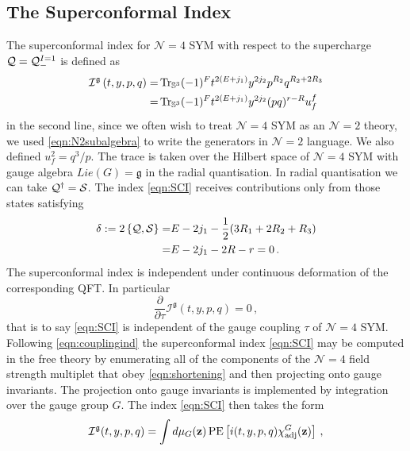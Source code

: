 \documentclass[main.tex]{subfiles}
\begin{document}
\subsection{The Superconformal Index}
The superconformal index for $\mathcal{N}=4$ SYM with respect to the supercharge $\mathcal{Q}=\mathcal{Q}_{-}^{I=1}$ is defined as \cite{Kinney:2005ej,Romelsberger:2005eg}
\begin{equation}
\begin{aligned}\label{eqn:SCI}
 \mathcal{I}^{\mathfrak{g}}\left(t,y,p,q\right)=&\operatorname{Tr}_{\mathbb{S}^3}(-1)^Ft^{2(E+j_1)}y^{2j_2}p^{R_2}q^{R_2+2R_3}\\
 =&\operatorname{Tr}_{\mathbb{S}^3}(-1)^Ft^{2(E+j_1)}y^{2j_2}(pq)^{r-R}u_f^f 
\end{aligned}
\end{equation}
in the second line, since we often wish to treat $\mathcal{N}=4$ SYM as an $\mathcal{N}=2$ theory, we used \eqref{eqn:N2subalgebra} to write the generators in $\mathcal{N}=2$ language. We also defined $u_f^2=q^3/p$. The trace is taken over the Hilbert space of $\mathcal{N}=4$ SYM with gauge algebra $Lie(G)=\mathfrak{g}$ in the radial quantisation. In radial quantisation we can take $\mathcal{Q}^{\dagger}=\mathcal{S}$. The index \eqref{eqn:SCI} receives contributions only from those states satisfying
\begin{align}\label{eqn:shortening}
\delta:=2\left\{\mathcal{Q},\mathcal{S}\right\}=&E-2j_1-\frac{1}{2}(3R_1+2R_2+R_3)\\
=&E-2j_1-2R-r=0\,.
\end{align}
The superconformal index is independent under continuous deformation of the corresponding QFT. In particular
\begin{equation}\label{eqn:couplingind}
\frac{\partial}{\partial \tau} \mathcal{I}^{\mathfrak{g}}\left(t,y,p,q\right)=0\,,
\end{equation}
that is to say \eqref{eqn:SCI} is independent of the gauge coupling $\tau$ of $\mathcal{N}=4$ SYM.
Following \eqref{eqn:couplingind} the superconformal index \eqref{eqn:SCI} may be computed in the free theory by enumerating all of the components of the $\mathcal{N}=4$ field strength multiplet that obey \eqref{eqn:shortening} and then projecting onto gauge invariants. The projection onto gauge invariants is implemented by integration over the gauge group $G$. The index \eqref{eqn:SCI} then takes the form
\begin{equation}\label{eqn:SCIPrescription} 
\mathcal{I}^{\mathfrak{g}}(t,y,p,q)=\int d\mu_{G}(\mathbf{z}) \operatorname{\mathrm{PE}}\left[i(t,y,p,q)\chi_{\text{adj}}^{G}(\mathbf{z})\right] \, ,
\end{equation}
\end{document}
